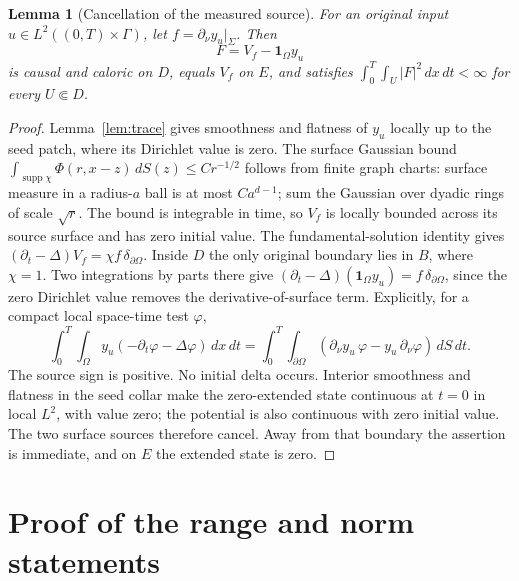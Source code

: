 \documentclass[11pt]{article}
\newtheorem{lemma}[theorem]{Lemma}
\theoremstyle{remark}
\newcommand{\Om}{\Omega}
\newcommand{\dt}{\partial_t}
\newcommand{\dn}{\partial_\nu}
\begin{document}
\begin{lemma}[Cancellation of the measured source]\label{lem:cancel}
For an original input $u\in L^2((0,T)\times\Gamma)$, let
$f=\dn y_u|_\Sigma$. Then
\[
 F=V_f-\mathbf1_\Om y_u
\]
is causal and caloric on $D$, equals $V_f$ on $E$, and satisfies
$\int_0^T\int_U|F|^2\,dx\,dt<\infty$ for every $U\Subset D$.
\end{lemma}
\begin{proof}
Lemma~\ref{lem:trace} gives smoothness and flatness of $y_u$ locally up to
the seed patch, where its Dirichlet value is zero.
The surface Gaussian bound
$\int_{\operatorname{supp}\chi}\Phi(r,x-z)\,dS(z)\leq Cr^{-1/2}$
follows from finite graph charts: surface measure in a radius-$a$ ball
is at most $Ca^{d-1}$; sum the Gaussian over dyadic rings of scale
$\sqrt r$. The bound is integrable in time, so $V_f$ is locally bounded
across its source surface and has zero initial value.
The fundamental-solution identity gives
$(\dt-\Delta)V_f=\chi f\,\delta_{\partial\Om}$.
Inside $D$ the only original boundary lies in $B$, where $\chi=1$.
Two integrations by parts there give
$(\dt-\Delta)(\mathbf1_\Om y_u)=f\,\delta_{\partial\Om}$,
since the zero Dirichlet value removes the derivative-of-surface term.
Explicitly, for a compact local space-time test $\varphi$,
\[
 \int_0^T\int_\Om y_u(-\dt\varphi-\Delta\varphi)\,dx\,dt
   =\int_0^T\int_{\partial\Om}
           (\dn y_u\,\varphi-y_u\,\dn\varphi)\,dS\,dt.
\]
The source sign is positive.
No initial delta occurs. Interior smoothness and flatness in the seed
collar make the zero-extended state continuous at $t=0$ in local $L^2$,
with value zero; the potential is also continuous with zero initial value.
The two surface sources therefore cancel.
Away from that boundary the assertion is immediate, and on $E$ the
extended state is zero.
\end{proof}

\section{Proof of the range and norm statements}\label{sec:rangeproof}
\end{document}
